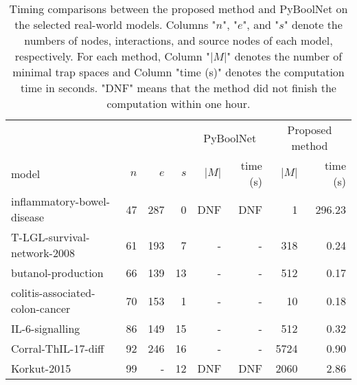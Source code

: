 \documentclass[runningheads]{llncs}
\begin{document}
\begin{table}[!htb]
  \caption{Timing comparisons between the proposed method and PyBoolNet on the selected real-world models.
    Columns "\(n\)", "\(e\)", and "\(s\)" denote the numbers of nodes, interactions, and source nodes of each model, respectively. For each method, Column "\(|M|\)" denotes the number of minimal trap spaces and Column "time (s)" denotes the computation time in seconds.
    "DNF" means that the method did not finish the computation within one hour.}
  \centering
  \label{tab:result_real}
  \begin{tabular}{lrrrrrrr}
    \toprule
    & & & & \multicolumn{2}{c}{PyBoolNet} & \multicolumn{2}{c}{Proposed method}\\
    \cmidrule(lr){5-6}\cmidrule(lr){7-8}
    model & $n$ & $e$ & $s$ & $|M|$ & time (s) & $|M|$ & time (s) \\ \midrule
    inflammatory-bowel-disease~\cite{DBLP:journals/bmcsb/HelikarKMBRMWSLR12} & 47 & 287 & 0 & DNF & DNF & 1 & 296.23 \\
    T-LGL-survival-network-2008~\cite{DBLP:journals/bmcsb/HelikarKMBRMWSLR12} & 61 & 193 & 7 & - & - & 318 & 0.24 \\
    butanol-production~\cite{DBLP:journals/bmcsb/HelikarKMBRMWSLR12} & 66 & 139 & 13 & - & - & 512 & 0.17 \\
    colitis-associated-colon-cancer~\cite{DBLP:journals/bmcsb/HelikarKMBRMWSLR12} & 70 & 153 & 1 & - & - & 10 & 0.18 \\
    IL-6-signalling~\cite{DBLP:journals/bmcsb/HelikarKMBRMWSLR12} & 86 & 149 & 15 & - & - & 512 & 0.32 \\
    Corral-ThIL-17-diff~\cite{corral2021interplay} & 92 & 246 & 16 & - & - & 5724 & 0.90 \\
    Korkut-2015~\cite{lee2019signal} & 99 & - & 12 & DNF & DNF & 2060 & 2.86 \\ \midrule
    

\end{tabular}
\end{table}
\end{document}
